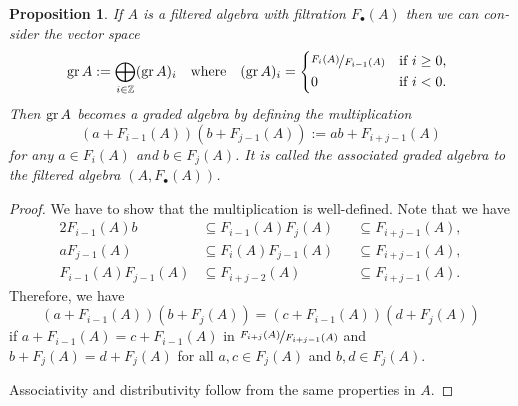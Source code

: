 \documentclass[12pt,a4paper]{scrartcl}
\theoremstyle{cplain}
\theoremstyle{cplain}
\theoremstyle{cplain}
\newtheorem{prop}[thmcounter]{Proposition}
\theoremstyle{definition}
\begin{document}
\begin{otherlanguage}{english}
\begin{prop}
  If $A$ is a filtered algebra with filtration $F_\bullet (A)$ then we can consider the vector space \[ \gr A := \bigoplus_{i \in \IZ} (\gr A)_i \quad\text{where}\quad (\gr A)_i = \begin{cases*}
                                                                          \fak{F_i(A)}{F_{i-1}(A)} & if $i \ge 0$, \\
                                                                          0 & if $i<0$.
                                                                        \end{cases*} \]
  Then $\operatorname{gr} A$ becomes a graded algebra by defining the multiplication \[ (a + F_{i-1}(A))(b+F_{j-1}(A)) := ab + F_{i+j-1}(A) \] for any $a \in F_i(A)$ and $b \in F_j(A)$. It is called the \emph{associated graded algebra} to the filtered algebra $(A,F_\bullet(A))$.
\end{prop}
\begin{proof}
  We have to show that the multiplication is well-defined. Note that we have
  \begin{alignat*}{2}
    F_{i-1}(A) b &\subseteq F_{i-1}(A)F_j(A) &&\subseteq F_{i+j-1}(A), \\
    aF_{j-1}(A) &\subseteq F_i(A)F_{j-1}(A)  &&\subseteq F_{i+j-1}(A), \\
    F_{i-1}(A) F_{j-1}(A) & \subseteq F_{i+j-2}(A) && \subseteq F_{i+j-1}(A).
  \end{alignat*}
  Therefore, we have \[(a + F_{i-1}(A))(b+F_{j}(A))=(c + F_{i-1}(A))(d+F_{j}(A))\] if $a+F_{i-1}(A) = c+F_{i-1}(A)$ in $\nicefrac{F_{i+j}(A)}{F_{i+j-1}(A)}$ and $b+F_j(A) = d+F_j(A)$ for all $a,c \in F_j(A)$ and $b,d \in F_j(A)$.
  
  Associativity and distributivity follow from the same properties in $A$.
\end{proof}


\end{otherlanguage}
\end{document}

